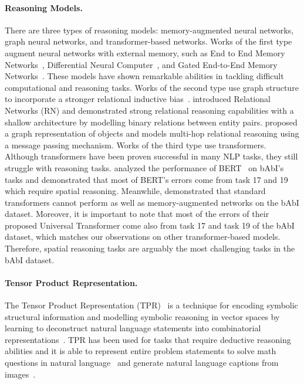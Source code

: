 \documentclass[letterpaper]{article} \usepackage{aaai22}  \usepackage{times}  \usepackage{helvet}  \usepackage{courier}  \usepackage[hyphens]{url}  \usepackage{graphicx} \urlstyle{rm} \def\UrlFont{\rm}  \usepackage{natbib}  \usepackage{caption} \DeclareCaptionStyle{ruled}{labelfont=normalfont,labelsep=colon,strut=off} \frenchspacing  \setlength{\pdfpagewidth}{8.5in}  \setlength{\pdfpageheight}{11in}  \usepackage{algorithm}
\begin{document}
\paragraph{Reasoning Models.}
There are three types of reasoning models: 
memory-augmented neural networks, graph neural networks, and transformer-based networks. Works of the first type augment neural networks with external memory, such as End to End Memory Networks~\cite{sukhbaatar2015end}, Differential Neural Computer~\cite{graves2016hybrid}, and Gated End-to-End Memory Networks~\cite{liu2017gated}. These models have shown remarkable abilities in tackling difficult computational and reasoning tasks. 
Works of the second type use graph structure to 
incorporate a stronger relational inductive bias~\cite{battaglia2018relational}.
\citet{santoro2017simple} introduced Relational Networks (RN) and demonstrated strong relational reasoning capabilities with a shallow architecture by modelling binary relations between entity pairs. 
\citet{palm2018recurrent} proposed a graph representation of objects and models multi-hop relational reasoning using a message passing mechanism. 
Works of the third type use transformers. 
Although transformers have been proven successful in many NLP tasks, they still struggle with reasoning tasks. \citet{van2019does} analyzed the performance of BERT~\cite{devlin2018bert} on bAbI's tasks and demonstrated that most of BERT's errors come from task 17 and 19 which require spatial reasoning. Meanwhile, \citet{dehghani2018universal} demonstrated that standard transformers cannot perform as well as memory-augmented networks on the bAbI dataset.  
Moreover, it is important to note that most of the errors of their proposed Universal Transformer come also from task 17 and task 19 of the bAbI dataset, which matches our observations on other transformer-based models.
Therefore, spatial reasoning tasks are arguably the most challenging tasks in the bAbI dataset.


\paragraph{Tensor Product Representation.}
The Tensor  Product  Representation (TPR)~\cite{smolensky1990tensor, schlag2020learning} is a technique for encoding symbolic structural information and modelling symbolic reasoning in vector spaces by learning to deconstruct natural language statements into combinatorial representations~\cite{chen2020mapping}. 
TPR has been used for tasks that require deductive reasoning abilities and it is able to represent entire problem statements to solve math questions in natural language~\cite{chen2020mapping} and generate natural language captions from images~\cite{huang2018tensor}. 
\end{document}
